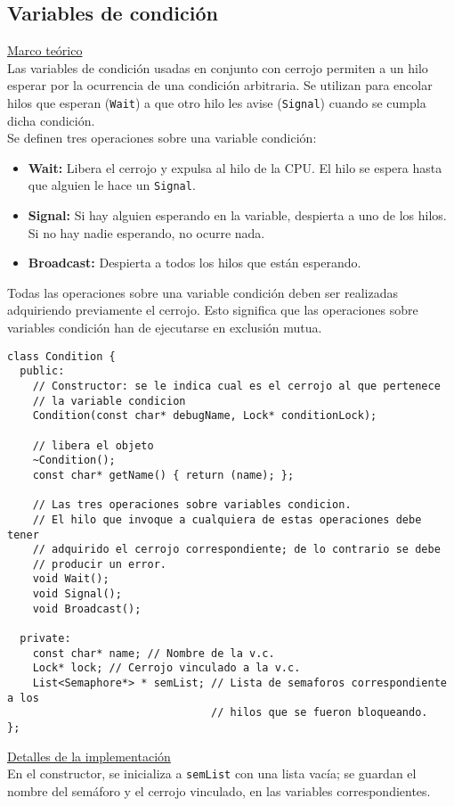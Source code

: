 \subsection*{Variables de condición}
\textsf{\underline{Marco teórico}}\\
 Las variables de condición usadas en conjunto con cerrojo permiten a un hilo esperar por la ocurrencia de una condición arbitraria. Se utilizan para encolar hilos que esperan (\texttt{Wait}) a que otro hilo les avise (\texttt{Signal}) cuando se cumpla dicha condición.\\
Se definen tres operaciones sobre una variable condición:
\begin{itemize}
	\item \textbf{Wait: } Libera el cerrojo y expulsa al hilo de la CPU. El hilo se espera hasta que alguien le hace un \texttt{Signal}.
	\item \textbf{Signal: } Si hay alguien esperando en la variable, despierta a uno de los hilos. Si no hay nadie esperando, no ocurre nada.
	\item \textbf{Broadcast: } Despierta a todos los hilos que están esperando.
\end{itemize}
Todas las operaciones sobre una variable condición deben ser realizadas adquiriendo previamente el cerrojo. Esto significa que las operaciones sobre variables condición han de ejecutarse en exclusión mutua.
\newpage
\begin{lstlisting}[style=C]
class Condition {
  public:
    // Constructor: se le indica cual es el cerrojo al que pertenece
    // la variable condicion
	Condition(const char* debugName, Lock* conditionLock);	

    // libera el objeto
    ~Condition();	
    const char* getName() { return (name); };

    // Las tres operaciones sobre variables condicion.
    // El hilo que invoque a cualquiera de estas operaciones debe tener
    // adquirido el cerrojo correspondiente; de lo contrario se debe
    // producir un error.
    void Wait(); 	
    void Signal();   
    void Broadcast();

  private:
    const char* name; // Nombre de la v.c.
    Lock* lock;	// Cerrojo vinculado a la v.c.
    List<Semaphore*> * semList; // Lista de semaforos correspondiente a los
                                // hilos que se fueron bloqueando.
};
\end{lstlisting}
\textsf{\underline{Detalles de la implementación}}\\
En el constructor, se inicializa a \texttt{semList} con una lista vacía; se guardan el nombre del semáforo y el cerrojo vinculado, en las variables correspondientes.\\

